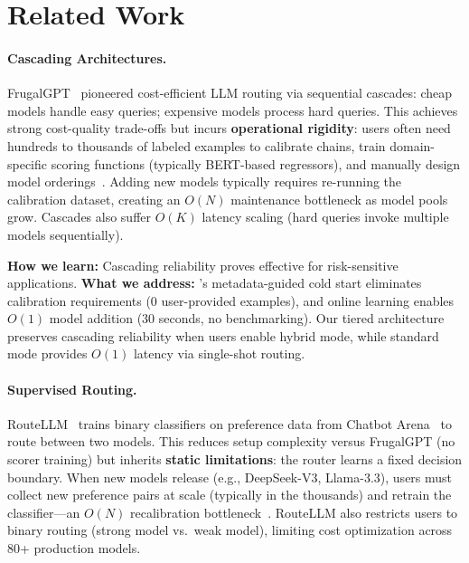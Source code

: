 
\section{Related Work}
\label{sec:related_work}

\paragraph{Cascading Architectures.}
FrugalGPT~\cite{chen2023frugalgpt} pioneered cost-efficient LLM routing via sequential cascades: cheap models handle easy queries; expensive models process hard queries. This achieves strong cost-quality trade-offs but incurs \textbf{operational rigidity}: users often need hundreds to thousands of labeled examples to calibrate chains, train domain-specific scoring functions (typically BERT-based regressors), and manually design model orderings~\cite{chen2023frugalgpt}. Adding new models typically requires re-running the calibration dataset, creating an $O(N)$ maintenance bottleneck as model pools grow. Cascades also suffer $O(K)$ latency scaling (hard queries invoke multiple models sequentially).

\textbf{How we learn:} Cascading reliability proves effective for risk-sensitive applications. \textbf{What we address:} \ours{}'s metadata-guided cold start eliminates calibration requirements (0 user-provided examples), and online learning enables $O(1)$ model addition (30 seconds, no benchmarking). Our tiered architecture preserves cascading reliability when users enable hybrid mode, while standard mode provides $O(1)$ latency via single-shot routing.

\paragraph{Supervised Routing.}
RouteLLM~\cite{ong2024routellm} trains binary classifiers on preference data from Chatbot Arena~\cite{zheng2023judging} to route between two models. This reduces setup complexity versus FrugalGPT (no scorer training) but inherits \textbf{static limitations}: the router learns a fixed decision boundary. When new models release (e.g., DeepSeek-V3, Llama-3.3), users must collect new preference pairs at scale (typically in the thousands) and retrain the classifier---an $O(N)$ recalibration bottleneck~\cite{ong2024routellm}. RouteLLM also restricts users to binary routing (strong model vs.\ weak model), limiting cost optimization across 80+ production models.

